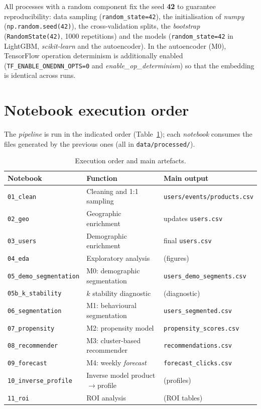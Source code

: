 All processes with a random component fix the seed \textbf{42} to guarantee reproducibility: data sampling (\texttt{random\_state=42}), the initialisation of \textit{numpy} (\texttt{np.random.seed(42)}), the cross-validation splits, the \textit{bootstrap} (\texttt{RandomState(42)}, 1000 repetitions) and the models (\texttt{random\_state=42} in LightGBM, \textit{scikit-learn} and the autoencoder). In the autoencoder (M0), TensorFlow operation determinism is additionally enabled (\texttt{TF\_ENABLE\_ONEDNN\_OPTS=0} and \textit{enable\_op\_determinism}) so that the embedding is identical across runs.

\section{Notebook execution order}

The \textit{pipeline} is run in the indicated order (Table~\ref{tab:pipeline}); each \textit{notebook} consumes the files generated by the previous ones (all in \texttt{data/processed/}).

\begin{table}[htbp]
\centering
\caption{Execution order and main artefacts.}
\label{tab:pipeline}
\begin{tabular}{lll}
\toprule
\textbf{Notebook} & \textbf{Function} & \textbf{Main output} \\
\midrule
\texttt{01\_clean}             & Cleaning and 1:1 sampling     & \texttt{users/events/products.csv} \\
\texttt{02\_geo}               & Geographic enrichment  & updates \texttt{users.csv} \\
\texttt{03\_users}             & Demographic enrichment & final \texttt{users.csv} \\
\texttt{04\_eda}               & Exploratory analysis       & (figures) \\
\texttt{05\_demo\_segmentation} & M0: demographic segmentation & \texttt{users\_demo\_segments.csv} \\
\texttt{05b\_k\_stability}      & $k$ stability diagnostic & (diagnostic) \\
\texttt{06\_segmentation}      & M1: behavioural segmentation & \texttt{users\_segmented.csv} \\
\texttt{07\_propensity}        & M2: propensity model    & \texttt{propensity\_scores.csv} \\
\texttt{08\_recommender}       & M3: cluster-based recommender & \texttt{recommendations.csv} \\
\texttt{09\_forecast}          & M4: weekly \textit{forecast} & \texttt{forecast\_clicks.csv} \\
\texttt{10\_inverse\_profile}  & Inverse model product$\to$profile & (profiles) \\
\texttt{11\_roi}               & ROI analysis             & (ROI tables) \\
\bottomrule
\end{tabular}
\end{table}

